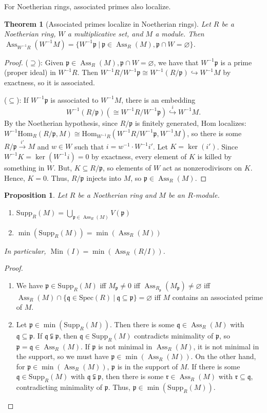 \documentclass{amsart}[12pt]
\def\Ass{\operatorname{Ass}}
\def\Min{\operatorname{Min}}
\def\ker{\operatorname{ker}}
\newcommand{\Hom}{\mathrm{Hom}}
\newcommand{\p}{{\mathfrak p}}
\newcommand{\q}{{\mathfrak q}}
\numberwithin{equation}{section}
\theoremstyle{plain} %
\newtheorem{theorem}[equation]{Theorem}
\newtheorem{prop}[equation]{Proposition}
\theoremstyle{definition}
\theoremstyle{remark}
\newcommand{\Spec}{\mathrm{Spec}}
\newcommand{\Supp}{\mathrm{Supp}}
\begin{document}
For Noetherian rings, associated primes also localize.

\begin{theorem}[Associated primes localize in Noetherian rings]
	Let $R$ be a Noetherian ring, $W$ a multiplicative set, and $M$ a module. Then $\Ass_{W^{-1}R}(W^{-1}M)=\{W^{-1}\p  \ | \ \p \in \Ass_R(M), \p \cap W = \varnothing\}$.
\end{theorem}
\begin{proof}
	($\supseteq$): Given $\p \in \Ass_R(M), \p \cap W= \varnothing$, we have that $W^{-1}\p$ is a prime (proper ideal) in $W^{-1}R$. Then $W^{-1}R /W^{-1}\p \cong W^{-1}(R/\p) \hookrightarrow W^{-1}M$ by exactness, so it is associated. 
	
	($\subseteq$): If $W^{-1}\p$ is associated to $W^{-1}M$, there is an embedding 
	\[ W^{-1}(R/\p) (\cong W^{-1}R /W^{-1}\p) \stackrel{i}{\hookrightarrow} W^{-1}M.\]
	 By the Noetherian hypothesis, since $R/\p$ is finitely generated, Hom localizes: $W^{-1} \Hom_R(R/\p,M) \cong \Hom_{W^{-1}R} (W^{-1}R /W^{-1}\p, W^{-1}M)$, so there is some $R/\p \xrightarrow{i'} M$ and $w\in W$ such that $i=w^{-1} \cdot W^{-1}i'$. Let $K=\ker(i')$. Since $W^{-1} K=\ker(W^{-1}i)=0$ by exactness, every element of $K$ is killed by something in $W$. But, $K\subseteq R/\p$, so elements of $W$ act as nonzerodivisors on $K$. Hence, $K=0$. Thus, $R/\p$ injects into $M$, so $\p\in \Ass_R(M)$.
\end{proof}

\begin{prop} Let $R$ be a Noetherian ring and $M$ be an $R$-module.
\begin{enumerate} 
\item $\Supp_R(M) = \bigcup_{\p \in \Ass_R(M)} V(\p)$
\item $\min(\Supp_R(M)) = \min(\Ass_R(M))$
\end{enumerate}
In particular, $\Min(I) = \min(\Ass_R(R/I))$.
\end{prop}
\begin{proof}
\begin{enumerate}
\item We have $\p\in \Supp_R(M)$ iff $M_{\p} \neq 0$ iff $\Ass_{R_\p}(M_\p) \neq \varnothing$ iff $\Ass_R(M) \cap \{ \q\in \Spec(R) \ | \ \q \subseteq \p\} = \varnothing$ iff $M$ contains an associated prime of $M$.
\item Let $\p\in \min(\Supp_R(M))$. Then there is some $\q\in \Ass_R(M)$ with $\q\subseteq \p$. If $\q\subsetneqq \p$, then $\q\in \Supp_R(M)$ contradicts minimality of $\p$, so $\p = \q\in \Ass_R(M)$. If $\p$ is not minimal in $\Ass_R(M)$, it is not minimal in the support, so we must have $\p\in \min(\Ass_R(M))$. On the other hand, for $\p\in \min(\Ass_R(M))$, $\p$ is in the support of $M$. If there is some $\q\in \Supp_R(M)$ with $\q\subsetneqq \p$, then there is some $\mathfrak{r}\in \Ass_R(M)$ with $\mathfrak{r}\subseteq \q$, contradicting minimality of $\p$. Thus, $\p \in \min(\Supp_R(M))$. \qedhere
\end{enumerate}\end{proof}
\end{document}
